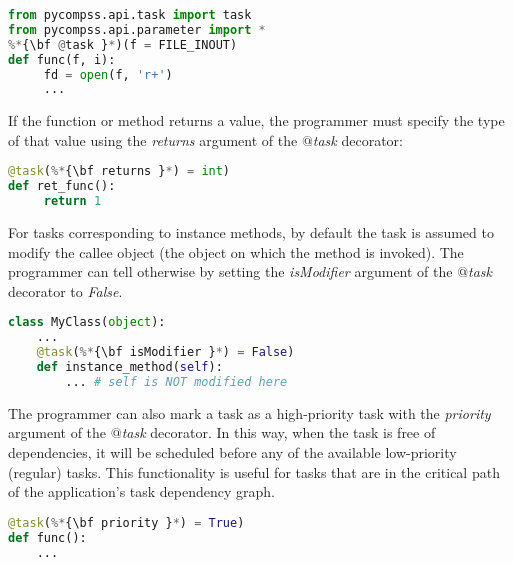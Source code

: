 \begin{lstlisting}[language=python]
from pycompss.api.task import task
from pycompss.api.parameter import *
%*{\bf @task }*)(f = FILE_INOUT)
def func(f, i):
     fd = open(f, 'r+')
     ...
\end{lstlisting}

If the function or method returns a value, the programmer must specify the type of that value using 
the {\it returns} argument of the {\it $@$task} decorator:

\begin{lstlisting}[language=python]
@task(%*{\bf returns }*) = int)
def ret_func():
     return 1
\end{lstlisting}

For tasks corresponding to instance methods, by default the task is assumed to modify the callee object 
(the object on which the method is invoked). The programmer can tell otherwise by setting the 
{\it isModifier} argument of the {\it $@$task} decorator to {\it False}.

\begin{lstlisting}[language=python]
class MyClass(object):
    ...
    @task(%*{\bf isModifier }*) = False)
    def instance_method(self):
        ... # self is NOT modified here
\end{lstlisting}

The programmer can also mark a task as a high-priority task with the {\it priority} argument of the 
{\it $@$task} decorator. In this way, when the task is free of dependencies, it will be scheduled before 
any of the available low-priority (regular) tasks. This functionality is useful for tasks that are in 
the critical path of the application’s task dependency graph.

\begin{lstlisting}[language=python]
@task(%*{\bf priority }*) = True)
def func():
    ...
\end{lstlisting}

